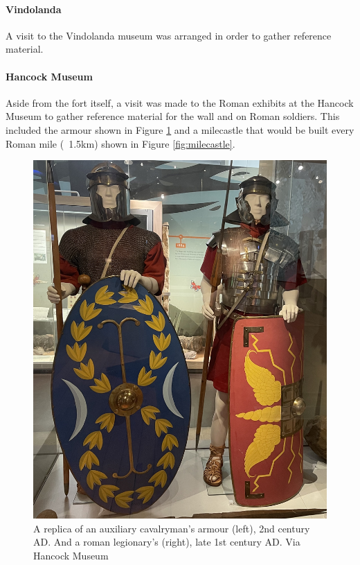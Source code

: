 \documentclass[sigconf,authordraft]{acmart}
\begin{document}
\paragraph{Vindolanda}
A visit to the Vindolanda museum was arranged in order to gather reference
material.

\paragraph{Hancock Museum}

Aside from the fort itself, a visit was made to the Roman exhibits at the
Hancock Museum to gather reference material for the wall and on Roman soldiers.
This included the armour shown in Figure \ref{fig:armour} and a milecastle that
would be built every Roman mile (~1.5km) \cite[p.1027]{smith_new_1851} shown in
Figure \ref{fig:milecastle}.

\begin{figure}[h]
  \includegraphics[width=0.8\linewidth]{armour.jpg}
  \caption{\label{fig:armour} A replica of an auxiliary cavalryman's armour
    (left), 2nd century AD. And a roman legionary's (right), late 1st
    century AD.
  Via Hancock Museum}
\end{figure}
\end{document}
